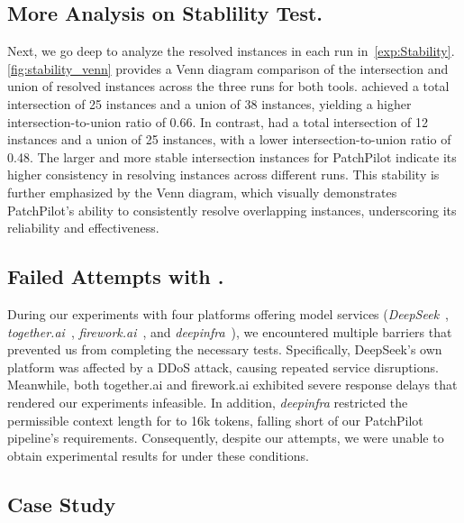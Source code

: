 \subsection{More Analysis on Stablility Test.}
\label{appx:exp2}
Next, we go deep to analyze the resolved instances in each run in~\cref{exp:Stability}. 
\cref{fig:stability_venn} provides a Venn diagram comparison of the intersection and union of resolved instances across the three runs for both tools. 
\sys{} achieved a total intersection of 25 instances and a union of 38 instances, yielding a higher intersection-to-union ratio of 0.66. 
In contrast, \openhands had a total intersection of 12 instances and a union of 25 instances, with a lower intersection-to-union ratio of 0.48. 
The larger and more stable intersection instances for PatchPilot indicate its higher consistency in resolving instances across different runs. 
This stability is further emphasized by the Venn diagram, which visually demonstrates PatchPilot's ability to consistently resolve overlapping instances, underscoring its reliability and effectiveness.


\subsection{Failed Attempts with \deepseek.}
\label{appx:exp4}
During our experiments with four platforms offering \deepseek model services (\emph{DeepSeek}~\cite{DeepSeek-r1}, \emph{together.ai}~\cite{together.ai}, \emph{firework.ai}~\cite{fireworks.ai}, and \emph{deepinfra}~\cite{deepinfra}), we encountered multiple barriers that prevented us from completing the necessary tests. 
Specifically, DeepSeek’s own platform was affected by a DDoS attack, causing repeated service disruptions. Meanwhile, both together.ai and firework.ai exhibited severe response delays that rendered our experiments infeasible. 
In addition, \emph{deepinfra} restricted the permissible context length for \deepseek to 16k tokens, falling short of our PatchPilot pipeline’s requirements. 
Consequently, despite our attempts, we were unable to obtain experimental results for \deepseek under these conditions.



\subsection{Case Study}
\label{appx:case_study}

